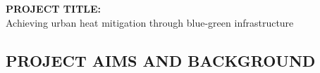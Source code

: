 %
%
%
%
%
%
%
%
%
%
%
%


\noindent \textbf{PROJECT TITLE: }\\ \noindent Achieving urban heat mitigation through blue-green infrastructure

\subsection*{\TitleFont PROJECT AIMS AND BACKGROUND}



